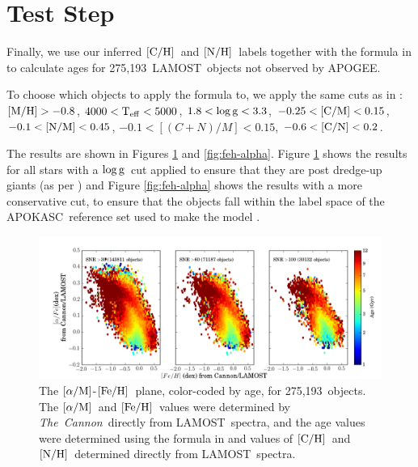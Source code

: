 \documentclass[12pt, preprint]{aastex}
\newcommand{\tc}{\textsl{The~Cannon}}
\newcommand{\apogee}{APOGEE}
\newcommand{\lamost}{LAMOST}
\newcommand{\apokasc}{APOKASC}
\newcommand{\teff}{\mbox{$\rm T_{eff}$}}
\newcommand{\logg}{\mbox{$\rm \log g$}}
\newcommand{\mh}{\mbox{$\rm [M/H]$}}
\newcommand{\feh}{\mbox{$\rm [Fe/H]$}}
\newcommand{\alpham}{\mbox{$\rm [\alpha/M]$}}
\newcommand{\cm}{\mbox{$\rm [C/M]$}}
\newcommand{\carbon}{\mbox{$\rm [C/H]$}}
\newcommand{\cn}{\mbox{$\rm [C/N]$}}
\newcommand{\nitrogen}{\mbox{$\rm [N/H]$}}
\newcommand{\nm}{\mbox{$\rm [N/M]$}}
\newcommand{\ntestobj}{275,193}
\begin{document}
\section{Test Step}
\label{test-step}

Finally, we use our inferred \carbon\ and \nitrogen\ 
labels together with the formula in \citet{Martig2016}
to calculate ages for \ntestobj\ \lamost\ objects not observed by \apogee.

To choose which objects to apply the formula to,
we apply the same cuts as in \citet{Martig2016}:
$\mh > -0.8$, $4000 < \teff < 5000$, $1.8 < \logg < 3.3$,
$-0.25 < \cm < 0.15$, $-0.1 < \nm < 0.45$, $-0.1 < [(C+N)/M] < 0.15$,
$-0.6 < \cn < 0.2$. 

The results are shown in Figures \ref{fig:feh-alpha-logg}
and \ref{fig:feh-alpha}. 
Figure \ref{fig:feh-alpha-logg} shows the results
for all stars with a \logg\ cut applied to ensure that they
are post dredge-up giants (as per \citet{Martig2016})
and Figure \ref{fig:feh-alpha} shows the results with
a more conservative cut, to ensure that the objects
fall within the label space of the \apokasc\ reference set
used to make the model \citep{Martig2016}. 

\begin{figure}[ht!]
\centering
\includegraphics[scale=0.5]{feh_alpha_logg_all.png}
\caption{
The \alpham-\feh\ plane, color-coded by age, 
for \ntestobj\ objects. The \alpham\ and \feh\ values
were determined by \tc\ directly from \lamost\ spectra,
and the age values were determined using the formula
in \citet{Martig2016} and values of \carbon\ and \nitrogen\ 
determined directly from \lamost\ spectra.
}
\label{fig:feh-alpha-logg}
\end{figure}
\end{document}
